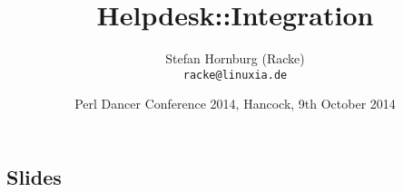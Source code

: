 \usepackage[utf8]{inputenc}
\usepackage[T1]{fontenc}
\usepackage{mathptmx}
\usepackage[scaled=.90]{helvet}
\usepackage{courier}
\usepackage{caption}
\captionsetup{labelformat=empty,labelsep=none}
\usepackage{verbatim}
\usepackage{hyperref}
\usepackage{listings}
\usepackage{ulem}
\lstset{language=Perl,basicstyle=\normalsize,tabsize=3,showstringspaces=false}

\title{Helpdesk::Integration}
\author[racke]{Stefan Hornburg (Racke)\\ \texttt{racke@linuxia.de}}
\date{Perl Dancer Conference 2014, Hancock, 9th October 2014}


\maketitle{}

\begin{frame}
  \titlepage
\end{frame}

\tableofcontents

\subsection{Slides}





